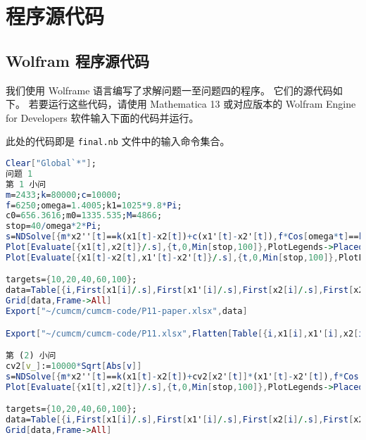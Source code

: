 \newpage
\section{程序源代码}

\subsection{Wolfram 程序源代码}

我们使用 Wolframe 语言编写了求解问题一至问题四的程序。
它们的源代码如下。
若要运行这些代码，请使用 Mathematica 13 或对应版本的 Wolfram Engine for Developers 软件输入下面的代码并运行。

此处的代码即是 \verb|final.nb| 文件中的输入命令集合。

\begin{lstlisting}[language=Mathematica,breaklines]
Clear["Global`*"];
问题 1
第 1 小问
m=2433;k=80000;c=10000;
f=6250;omega=1.4005;k1=1025*9.8*Pi;
c0=656.3616;m0=1335.535;M=4866;
stop=40/omega*2*Pi;
s=NDSolve[{m*x2''[t]==k(x1[t]-x2[t])+c(x1'[t]-x2'[t]),f*Cos[omega*t]==k(x1[t]-x2[t])+c(x1'[t]-x2'[t])+k1*x1[t]+c0*x1'[t]+m0*x1''[t]+M*x1''[t],x1[0]==x2[0]==x1'[0]==x2'[0]==0},{x1,x2},{t,0,Max[stop,100]}];
Plot[Evaluate[{x1[t],x2[t]}/.s],{t,0,Min[stop,100]},PlotLegends->Placed[{"x1","x2"},{1,0.5}],PlotStyle->{Directive[Blue,Thick],Directive[Orange,Dashed]}]
Plot[Evaluate[{x1[t]-x2[t],x1'[t]-x2'[t]}/.s],{t,0,Min[stop,100]},PlotLegends->Placed[{"\[CapitalDelta]x","\[CapitalDelta]v"},{1,0.5}]]

targets={10,20,40,60,100};
data=Table[{i,First[x1[i]/.s],First[x1'[i]/.s],First[x2[i]/.s],First[x2'[i]/.s]},{i,targets}];
Grid[data,Frame->All]
Export["~/cumcm/cumcm-code/P11-paper.xlsx",data]

Export["~/cumcm/cumcm-code/P11.xlsx",Flatten[Table[{i,x1[i],x1'[i],x2[i],x2'[i]}/.s,{i,Range[0,40/omega*2*Pi,0.2]}],1]]

第 (2) 小问
cv2[v_]:=10000*Sqrt[Abs[v]]
s=NDSolve[{m*x2''[t]==k(x1[t]-x2[t])+cv2[x2'[t]]*(x1'[t]-x2'[t]),f*Cos[omega*t]==k(x1[t]-x2[t])+cv2[x2'[t]]*(x1'[t]-x2'[t])+k1*x1[t]+c0*x1'[t]+m0*x1''[t]+M*x1''[t],x1[0]==x2[0]==x1'[0]==x2'[0]==0},{x1,x2},{t,0,Max[stop,100]}];
Plot[Evaluate[{x1[t],x2[t]}/.s],{t,0,Min[stop,100]},PlotLegends->Placed[{"x1","x2"},{1,0.5}],PlotStyle->{Directive[Green,Thick],Directive[Pink,Dashed]}]

targets={10,20,40,60,100};
data=Table[{i,First[x1[i]/.s],First[x1'[i]/.s],First[x2[i]/.s],First[x2'[i]/.s]},{i,targets}];
Grid[data,Frame->All]


\end{lstlisting}
